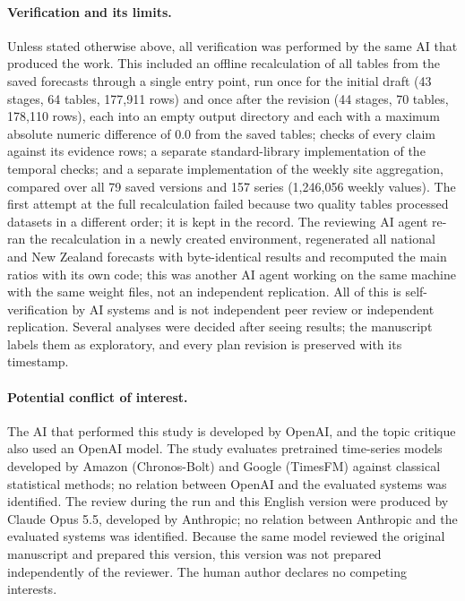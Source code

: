 \documentclass[11pt]{article}
\begin{document}
\paragraph{Verification and its limits.} Unless stated otherwise above, all verification was performed by the same AI that produced the work. This included an offline recalculation of all tables from the saved forecasts through a single entry point, run once for the initial draft (43 stages, 64 tables, 177,911 rows) and once after the revision (44 stages, 70 tables, 178,110 rows), each into an empty output directory and each with a maximum absolute numeric difference of 0.0 from the saved tables; checks of every claim against its evidence rows; a separate standard-library implementation of the temporal checks; and a separate implementation of the weekly site aggregation, compared over all 79 saved versions and 157 series (1,246,056 weekly values). The first attempt at the full recalculation failed because two quality tables processed datasets in a different order; it is kept in the record. The reviewing AI agent re-ran the recalculation in a newly created environment, regenerated all national and New Zealand forecasts with byte-identical results and recomputed the main ratios with its own code; this was another AI agent working on the same machine with the same weight files, not an independent replication. All of this is self-verification by AI systems and is not independent peer review or independent replication. Several analyses were decided after seeing results; the manuscript labels them as exploratory, and every plan revision is preserved with its timestamp.

\paragraph{Potential conflict of interest.} The AI that performed this study is developed by OpenAI, and the topic critique also used an OpenAI model. The study evaluates pretrained time-series models developed by Amazon (Chronos-Bolt) and Google (TimesFM) against classical statistical methods; no relation between OpenAI and the evaluated systems was identified. The review during the run and this English version were produced by Claude Opus 5.5, developed by Anthropic; no relation between Anthropic and the evaluated systems was identified. Because the same model reviewed the original manuscript and prepared this version, this version was not prepared independently of the reviewer. The human author declares no competing interests.
\end{document}
